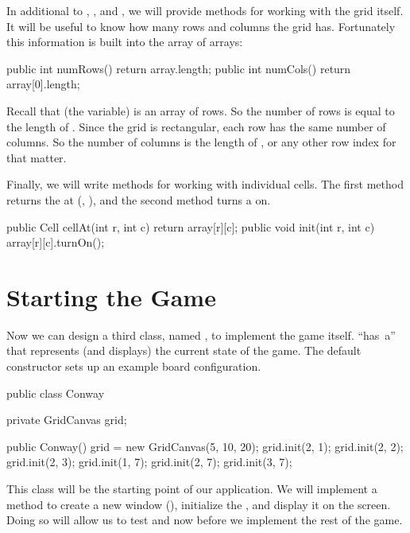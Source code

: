 In additional to , , and , we will provide methods for working with the grid itself.
It will be useful to know how many rows and columns the grid has.
Fortunately this information is built into the array of arrays:

\begin{code}
public int numRows() {
    return array.length;
}
public int numCols() {
    return array[0].length;
}
\end{code}

Recall that  (the variable) is an array of rows.
So the number of rows is equal to the length of .
Since the grid is rectangular, each row has the same number of columns.
So the number of columns is the length of , or any other row index for that matter.

Finally, we will write methods for working with individual cells.
The first method returns the  at (, ), and the second method turns a  on.

\begin{code}
public Cell cellAt(int r, int c) {
    return array[r][c];
}
public void init(int r, int c) {
    array[r][c].turnOn();
}
\end{code}


\section{Starting the Game}

Now we can design a third class, named , to implement the game itself.
 ``has~a''  that represents (and displays) the current state of the game.
The default constructor sets up an example board configuration.

\begin{code}
public class Conway {
    private GridCanvas grid;

    public Conway() {
        grid = new GridCanvas(5, 10, 20);
        grid.init(2, 1);
        grid.init(2, 2);
        grid.init(2, 3);
        grid.init(1, 7);
        grid.init(2, 7);
        grid.init(3, 7);
    }
}
\end{code}


This class will be the starting point of our application.
We will implement a  method to create a new window (), initialize the , and display it on the screen.
Doing so will allow us to test  and  now before we implement the rest of the game.

